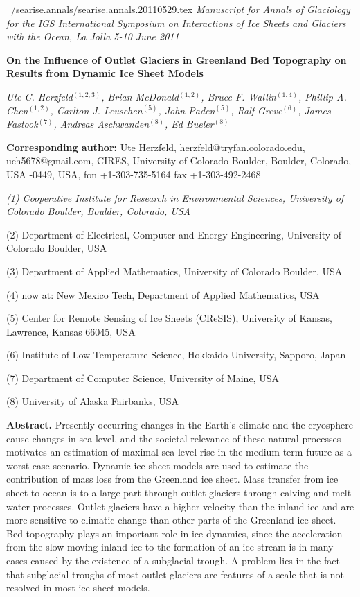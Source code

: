 \documentclass[11pt]{article}
\begin{document}
\hfill ~/searise.annals/searise.annals.20110529.tex\break 
{\it Manuscript for Annals of Glaciology for the IGS International Symposium on Interactions of Ice Sheets and Glaciers with the Ocean,
La Jolla 5-10 June 2011}


\bs
\bs
{\bf On the Influence of Outlet Glaciers in Greenland Bed Topography
on Results from Dynamic Ice Sheet Models}
\bs

{\it Ute C. Herzfeld$^{(1,2,3)}$, Brian McDonald$^{(1,2)}$, Bruce F. Wallin$^{(1,4)}$, Phillip A. Chen$^{(1,2)}$,
Carlton J. Leuschen$^{(5)}$, John Paden$^{(5)}$, 
Ralf Greve$^{(6)}$, James Fastook$^{(7)}$, Andreas Aschwanden$^{(8)}$, Ed Bueler$^{(8)}$


}

{\bf Corresponding author:} Ute Herzfeld, herzfeld@tryfan.colorado.edu, uch5678@gmail.com,\nl
CIRES, University of Colorado Boulder, Boulder, Colorado, USA -0449, USA, 
 fon +1-303-735-5164\nl
 fax +1-303-492-2468\nl


{\it
(1) Cooperative Institute for Research in Environmental Sciences, University of Colorado Boulder, Boulder, Colorado, USA 

(2) Department of Electrical, Computer and Energy Engineering,  University of Colorado Boulder, USA

(3) Department of Applied Mathematics, University of Colorado Boulder, USA

(4) now at: New Mexico Tech, Department of Applied Mathematics, USA

(5)  Center for Remote Sensing of Ice Sheets (CReSIS), University of Kansas, Lawrence, Kansas 66045, USA

(6) Institute of Low Temperature Science,  Hokkaido University, Sapporo, Japan

(7) Department of Computer Science, University of Maine, USA

(8) University of Alaska Fairbanks, USA
}


\bs
{\bf Abstract.}
Presently occurring changes in the Earth's climate and the cryosphere cause changes
in sea level, and the societal relevance of these natural processes motivates an estimation of maximal sea-level rise in the medium-term future as a worst-case scenario. Dynamic ice sheet models are used to estimate the contribution
of mass loss from the Greenland ice sheet. 
Mass transfer from ice sheet to ocean is to a large part through outlet glaciers through calving and melt-water processes.
Outlet glaciers have a higher velocity than the inland ice and 
 are more sensitive to climatic change than other parts of the 
Greenland ice sheet.
Bed topography plays an important role in ice dynamics,
since the acceleration from the slow-moving inland ice to the formation of an ice stream is in many cases caused by
the existence of a subglacial trough.
A problem lies in the fact that subglacial troughs of most outlet glaciers are features of a scale that is not
resolved in most ice sheet models. 
\end{document}
